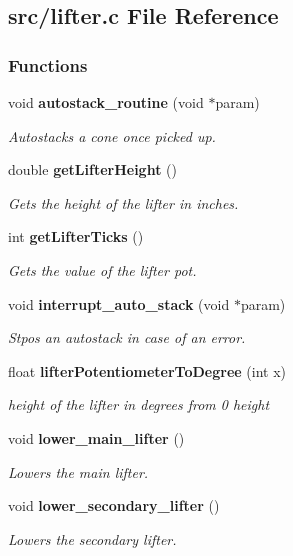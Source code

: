 \subsection{src/lifter.c File Reference}
\label{lifter_8c}
\subsubsection*{Functions}
\begin{DoxyCompactItemize}
\item 
void \textbf{ autostack\+\_\+routine} (void $\ast$param)
\begin{DoxyCompactList}\small\item\em Autostacks a cone once picked up. \end{DoxyCompactList}\item 
double \textbf{ get\+Lifter\+Height} ()
\begin{DoxyCompactList}\small\item\em Gets the height of the lifter in inches. \end{DoxyCompactList}\item 
int \textbf{ get\+Lifter\+Ticks} ()
\begin{DoxyCompactList}\small\item\em Gets the value of the lifter pot. \end{DoxyCompactList}\item 
void \textbf{ interrupt\+\_\+auto\+\_\+stack} (void $\ast$param)
\begin{DoxyCompactList}\small\item\em Stpos an autostack in case of an error. \end{DoxyCompactList}\item 
float \textbf{ lifter\+Potentiometer\+To\+Degree} (int x)
\begin{DoxyCompactList}\small\item\em height of the lifter in degrees from 0 height \end{DoxyCompactList}\item 
void \textbf{ lower\+\_\+main\+\_\+lifter} ()
\begin{DoxyCompactList}\small\item\em Lowers the main lifter. \end{DoxyCompactList}\item 
void \textbf{ lower\+\_\+secondary\+\_\+lifter} ()
\begin{DoxyCompactList}\small\item\em Lowers the secondary lifter. \end{DoxyCompactList}\item 

\end{DoxyCompactItemize}
